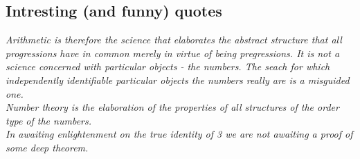 \documentclass[11pt]{article}
\theoremstyle{definition}
\theoremstyle{example}
\theoremstyle{remark}
\theoremstyle{lemma}
\theoremstyle{proposition}
\theoremstyle{Problem}
\theoremstyle{Solution}
\theoremstyle{theorem}
\begin{document}
\subsection{Intresting (and funny) quotes}
\textit{Arithmetic is therefore the science that elaborates the abstract structure that all progressions have in common merely in virtue of being pregressions. It is not a science concerned with particular objects - the numbers. The seach for which independently identifiable particular objects the numbers really are is a misguided one.}\\ 

\textit{Number theory is the elaboration of the properties of all structures of the order type of the numbers.}\\

\textit{In awaiting enlightenment on the true identity of 3 we are not awaiting a proof of some deep theorem.}
\end{document}
